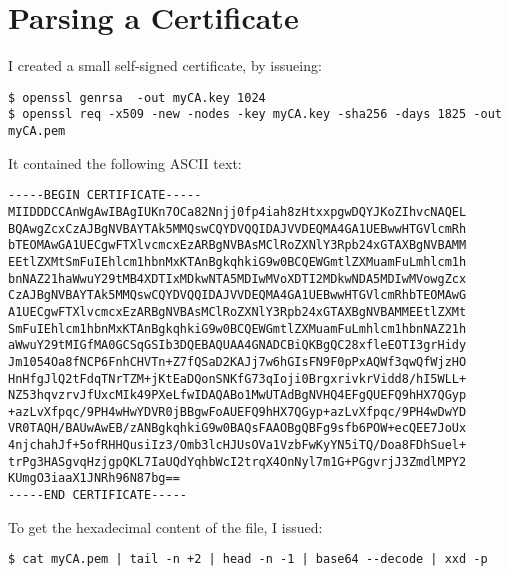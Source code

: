 \newpage
\section{Parsing a Certificate}
\label{sec:app:b}

I created a small self-signed certificate, by issueing:

\begin{changemargin}{-60mm}{0mm}
\begin{myquote}
\begin{verbatim}
$ openssl genrsa  -out myCA.key 1024
$ openssl req -x509 -new -nodes -key myCA.key -sha256 -days 1825 -out 
myCA.pem
\end{verbatim}
\end{myquote}
\end{changemargin}

It contained the following ASCII text:

\begin{changemargin}{-60mm}{0mm}
\begin{myquote}
\begin{verbatim}
-----BEGIN CERTIFICATE-----
MIIDDDCCAnWgAwIBAgIUKn7OCa82Nnjj0fp4iah8zHtxxpgwDQYJKoZIhvcNAQEL
BQAwgZcxCzAJBgNVBAYTAk5MMQswCQYDVQQIDAJVVDEQMA4GA1UEBwwHTGVlcmRh
bTEOMAwGA1UECgwFTXlvcmcxEzARBgNVBAsMClRoZXNlY3Rpb24xGTAXBgNVBAMM
EEtlZXMtSmFuIEhlcm1hbnMxKTAnBgkqhkiG9w0BCQEWGmtlZXMuamFuLmhlcm1h
bnNAZ21haWwuY29tMB4XDTIxMDkwNTA5MDIwMVoXDTI2MDkwNDA5MDIwMVowgZcx
CzAJBgNVBAYTAk5MMQswCQYDVQQIDAJVVDEQMA4GA1UEBwwHTGVlcmRhbTEOMAwG
A1UECgwFTXlvcmcxEzARBgNVBAsMClRoZXNlY3Rpb24xGTAXBgNVBAMMEEtlZXMt
SmFuIEhlcm1hbnMxKTAnBgkqhkiG9w0BCQEWGmtlZXMuamFuLmhlcm1hbnNAZ21h
aWwuY29tMIGfMA0GCSqGSIb3DQEBAQUAA4GNADCBiQKBgQC28xfleEOTI3grHidy
Jm1054Oa8fNCP6FnhCHVTn+Z7fQSaD2KAJj7w6hGIsFN9F0pPxAQWf3qwQfWjzHO
HnHfgJlQ2tFdqTNrTZM+jKtEaDQonSNKfG73qIoji0BrgxrivkrVidd8/hI5WLL+
NZ53hqvzrvJfUxcMIk49PXeLfwIDAQABo1MwUTAdBgNVHQ4EFgQUEFQ9hHX7QGyp
+azLvXfpqc/9PH4wHwYDVR0jBBgwFoAUEFQ9hHX7QGyp+azLvXfpqc/9PH4wDwYD
VR0TAQH/BAUwAwEB/zANBgkqhkiG9w0BAQsFAAOBgQBFg9sfb6POW+ecQEE7JoUx
4njchahJf+5ofRHHQusiIz3/Omb3lcHJUsOVa1VzbFwKyYN5iTQ/Doa8FDhSuel+
trPg3HASgvqHzjgpQKL7IaUQdYqhbWcI2trqX4OnNyl7m1G+PGgvrjJ3ZmdlMPY2
KUmgO3iaaX1JNRh96N87bg==
-----END CERTIFICATE-----
\end{verbatim}
\end{myquote}
\end{changemargin}

To get the hexadecimal content of the file, I issued:

\begin{changemargin}{-60mm}{0mm}
\begin{myquote}
\begin{verbatim}
$ cat myCA.pem | tail -n +2 | head -n -1 | base64 --decode | xxd -p
\end{verbatim}
\end{myquote}
\end{changemargin}

